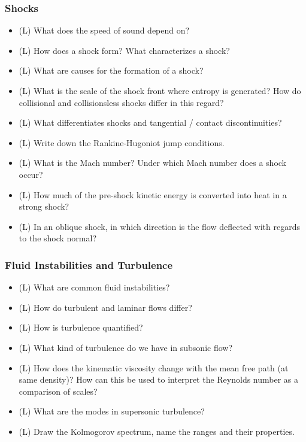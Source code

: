 \subsubsection*{Shocks}
\begin{itemize}
    \item (L) What does the speed of sound depend on?
    \answerboxS
    \item (L) How does a shock form? What characterizes a shock?
    \answerboxM
    \item (L) What are causes for the formation of a shock?
    \answerboxM
    \item (L) What is the scale of the shock front where entropy is generated? How do collisional
    and collisionsless shocks differ in this regard?
    \answerboxS
    \item (L) What differentiates shocks and tangential / contact discontinuities?
    \answerboxM
    \item (L) Write down the Rankine-Hugoniot jump conditions.
    \answerboxM
    \item (L) What is the Mach number? Under which Mach number does a shock occur?
    \answerboxS
    \item (L) How much of the pre-shock kinetic energy is converted into heat in a strong shock?
    \answerboxS
    \item (L) In an oblique shock, in which direction is the flow deflected with regards to the shock normal?
    \answerboxS
\end{itemize}

\subsubsection*{Fluid Instabilities and Turbulence}
\begin{itemize}
    \item (L) What are common fluid instabilities?
    \answerboxM
    \item (L) How do turbulent and laminar flows differ?
    \answerboxS
    \item (L) How is turbulence quantified?
    \answerboxS
    \item (L) What kind of turbulence do we have in subsonic flow?
    \answerboxS
    \item (L) How does the kinematic viscosity change with the mean free path (at same density)?
    How can this be used to interpret the Reynolds number as a comparison of scales?
    \answerboxS
    \item (L) What are the modes in supersonic turbulence?
    \answerboxS
    \item (L) Draw the Kolmogorov spectrum, name the ranges and their properties.
    \answerboxM
\end{itemize}

